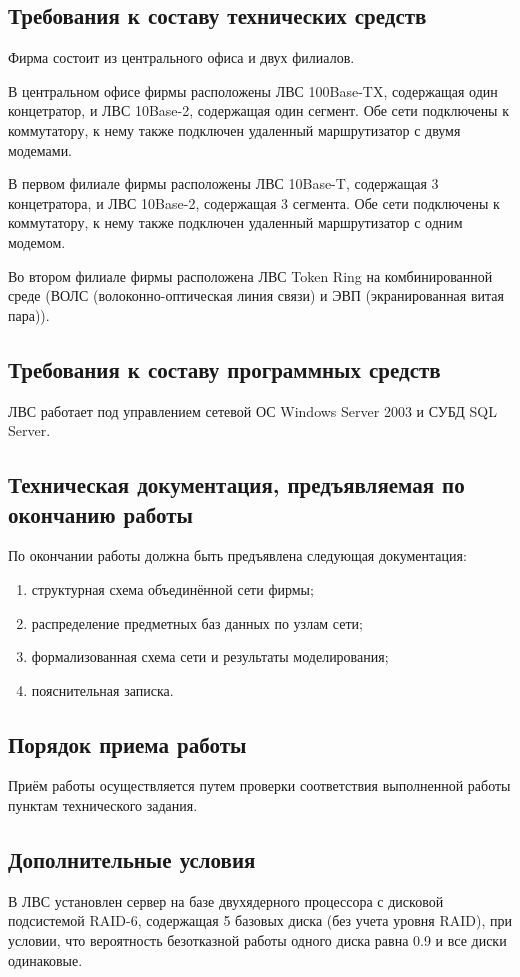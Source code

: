 \documentclass[russian,utf8,emptystyle]{eskdtext}
\begin{document}
\subsection{Требования к составу технических средств}
Фирма состоит из центрального офиса и двух филиалов.

В центральном офисе фирмы расположены ЛВС 100Base-TX, содержащая один концетратор, и ЛВС 10Base-2, содержащая один сегмент. Обе сети подключены к коммутатору, к нему также подключен удаленный маршрутизатор с двумя модемами. 

В первом филиале фирмы расположены ЛВС 10Base-T, содержащая 3 концетратора, и ЛВС 10Base-2, содержащая 3 сегмента. Обе сети подключены к коммутатору, к нему также подключен удаленный маршрутизатор с одним модемом.

Во втором филиале фирмы расположена ЛВС Token Ring на комбинированной среде (ВОЛС (волоконно-оптическая линия связи) и ЭВП (экранированная витая пара)). 

\subsection{Требования к составу программных средств}
ЛВС работает под управлением сетевой ОС Windows Server 2003 и СУБД SQL Server. 

\subsection{Техническая документация, предъявляемая по окончанию работы}
По окончании работы должна быть предъявлена следующая документация:
\begin{enumerate}[label=-]
\item структурная схема объединённой сети фирмы;
\item распределение предметных баз данных по узлам сети;
\item формализованная схема сети и результаты моделирования;
\item пояснительная записка.
\end{enumerate}

\subsection{Порядок приема работы}
Приём работы осуществляется путем проверки соответствия выполненной работы пунктам
технического задания.

\subsection{Дополнительные условия}
В ЛВС установлен сервер на базе двухядерного процессора с дисковой подсистемой RAID-6, содержащая 5 базовых диска (без учета уровня RAID), при условии, что вероятность безотказной работы одного диска равна 0.9 и все диски одинаковые.
\end{document}
